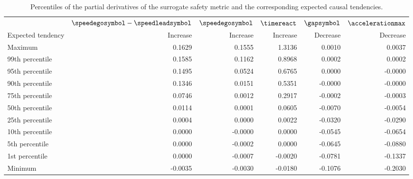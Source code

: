 \begin{table}
	\centering
	\caption{Percentiles of the partial derivatives of the surrogate safety metric and the corresponding expected causal tendencies.}
	\label{tab:tendencies}
	\begin{tabular}{lrrrrr}
		\toprule
		& $\speedegosymbol-\speedleadsymbol$ & $\speedegosymbol$ & $\timereact$ & $\gapsymbol$ & $\accelerationmax$ \\
		\otoprule
		Expected tendency & Increase & Increase & Increase & Decrease & Decrease \\
		Maximum         &  0.1629 &  0.1555 &  1.3136 &  0.0010 &  0.0037 \\
		99th percentile &  0.1585 &  0.1162 &  0.8968 &  0.0002 &  0.0002 \\
		95th percentile &  0.1495 &  0.0524 &  0.6765 &  0.0000 & -0.0000 \\
		90th percentile &  0.1346 &  0.0151 &  0.5351 & -0.0000 & -0.0000 \\
		75th percentile &  0.0746 &  0.0012 &  0.2917 & -0.0002 & -0.0003 \\
		50th percentile &  0.0114 &  0.0001 &  0.0605 & -0.0070 & -0.0054 \\
		25th percentile &  0.0004 &  0.0000 &  0.0022 & -0.0320 & -0.0290 \\
		10th percentile &  0.0000 & -0.0000 &  0.0000 & -0.0545 & -0.0654 \\
		 5th percentile &  0.0000 & -0.0002 &  0.0000 & -0.0645 & -0.0880 \\
		 1st percentile &  0.0000 & -0.0007 & -0.0020 & -0.0781 & -0.1337 \\
		Minimum         & -0.0035 & -0.0030 & -0.0180 & -0.1076 & -0.2030 \\
		\bottomrule
	\end{tabular}
\end{table}

